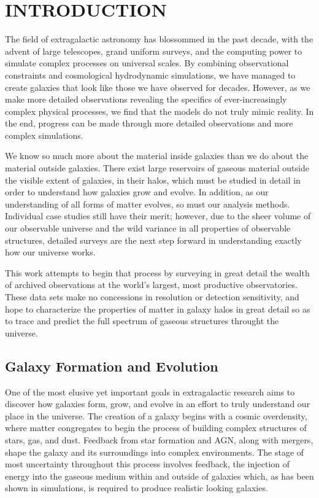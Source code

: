 \section{\MakeUppercase{Introduction}}
\label{ch1}

The field of extragalactic astronomy has blossommed in the past decade, with the advent of large telescopes, grand uniform surveys, and the computing power to simulate complex processes on universal scales. By combining observational constraints and cosmological hydrodynamic simulations, we have managed to create galaxies that look like those we have observed for decades. However, as we make more detailed observations revealing the specifics of ever-increasingly complex physical processes, we find that the models do not truly mimic reality. In the end, progress can be made through more detailed observations and more complex simulations.

We know so much more about the material inside galaxies than we do about the material outside galaxies. There exist large reservoirs of gaseous material outside the visible extent of galaxies, in their halos, which must be studied in detail in order to understand how galaxies grow and evolve. In addition, as our understanding of all forms of matter evolves, so must our analysis methods. Individual case studies still have their merit; however, due to the sheer volume of our observable universe and the wild variance in all properties of observable structures, detailed surveys are the next step forward in understanding exactly how our universe works.

This work attempts to begin that process by surveying in great detail the wealth of archived observations at the world's largest, most productive observatories. These data sets make no concessions in resolution or detection sensitivity, and hope to characterize the properties of matter in galaxy halos in great detail so as to trace and predict the full spectrum of gaseous structures throught the universe.

\subsection{Galaxy Formation and Evolution}
\label{ch1:galaxyevolution}

One of the most elusive yet important goals in extragalactic research aims to discover how galaxies form, grow, and evolve in an effort to truly understand our place in the universe. The creation of a galaxy begins with a cosmic overdensity, where matter congregates to begin the process of building complex structures of stars, gas, and dust. Feedback from star formation and AGN, along with mergers, shape the galaxy and its surroundings into complex environments. The stage of most uncertainty throughout this process involves feedback, the injection of energy into the gaseous medium within and outside of galaxies which, as has been shown in simulations, is required to produce realistic looking galaxies.

